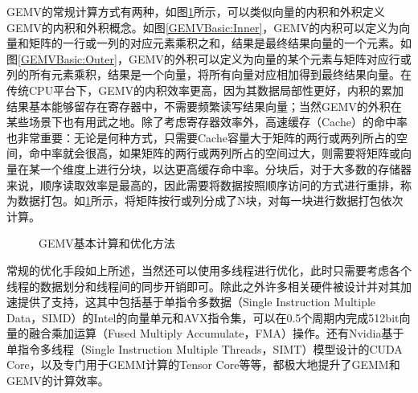 GEMV的常规计算方式有两种，如图\ref{GEMVBasic}所示，可以类似向量的内积和外积定义GEMV的内积和外积概念。如图\ref{GEMVBasic:Inner}，GEMV的内积可以定义为向量和矩阵的一行或一列的对应元素乘积之和，结果是最终结果向量的一个元素。如图\ref{GEMVBasic:Outer}，GEMV的外积可以定义为向量的某个元素与矩阵对应行或列的所有元素乘积，结果是一个向量，将所有向量对应相加得到最终结果向量。在传统CPU平台下，GEMV的内积效率更高，因为其数据局部性更好，内积的累加结果基本能够留存在寄存器中，不需要频繁读写结果向量；当然GEMV的外积在某些场景下也有用武之地。除了考虑寄存器效率外，高速缓存（Cache）的命中率也非常重要：无论是何种方式，只需要Cache容量大于矩阵的两行或两列所占的空间，命中率就会很高，如果矩阵的两行或两列所占的空间过大，则需要将矩阵或向量在某一个维度上进行分块，以达更高缓存命中率。分块后，对于大多数的存储器来说，顺序读取效率是最高的，因此需要将数据按照顺序访问的方式进行重排，称为数据打包。如\ref{GEMVBasic}所示，将矩阵按行或列分成了N块，对每一块进行数据打包依次计算。

\begin{figure}[htbp!]
	\centering
	\label{GEMVBasic}
	\caption{GEMV基本计算和优化方法}
\end{figure}

常规的优化手段如上所述，当然还可以使用多线程进行优化，此时只需要考虑各个线程的数据划分和线程间的同步开销即可。除此之外许多相关硬件被设计并对其加速提供了支持，这其中包括基于单指令多数据（Single Instruction Multiple Data，SIMD）的Intel的向量单元和AVX指令集，可以在0.5个周期内完成512bit向量的融合乘加运算（Fused Multiply Accumulate，FMA）操作\cite{IntelAVX}。还有Nvidia基于单指令多线程（Single Instruction Multiple Threads，SIMT）模型设计的CUDA Core\cite{Cuda}，以及专门用于GEMM计算的Tensor Core\cite{TensorCore}等等，都极大地提升了GEMM和GEMV的计算效率。

